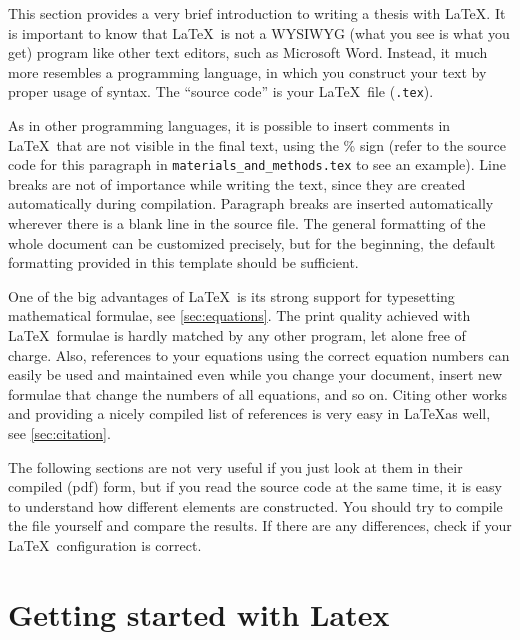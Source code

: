 This section provides a very brief introduction to writing a thesis with \LaTeX. 
It is important to know that \LaTeX\ is not a WYSIWYG (what you see is what you get) program like other text editors, such as Microsoft Word.
Instead, it much more resembles a programming language, in which you construct your text by proper usage of syntax.
The ``source code'' is your \LaTeX\ file (\texttt{.tex}). 

As in other programming languages, it is possible to insert comments in \LaTeX\ that are not visible in the final text, using the \% sign (refer to the source code for this paragraph in \texttt{materials\_and\_methods.tex} to see an example).
Line breaks are not of importance while writing the text, since they are created automatically during compilation.
Paragraph breaks are inserted automatically wherever there is a blank line in the source file.
The general formatting of the whole document can be customized precisely, but for the beginning, the default formatting provided in this template should be sufficient.

One of the big advantages of \LaTeX\ is its strong support for typesetting mathematical formulae, see \cref{sec:equations}.
The print quality achieved with \LaTeX\ formulae is hardly matched by any other program, let alone free of charge.
Also, references to your equations using the correct equation numbers can easily be used and maintained even while you change your document, insert new formulae that change the numbers of all equations, and so on.
Citing other works and providing a nicely compiled list of references is very easy in \LaTeX as well, see \cref{sec:citation}.

The following sections are not very useful if you just look at them in their compiled (pdf) form, but if you read the source code at the same time, it is easy to understand how different elements are constructed. 
You should try to compile the file yourself and compare the results. 
If there are any differences, check if your \LaTeX\ configuration is correct.

\section{Getting started with Latex}
\label{sec:getting-started-with}

